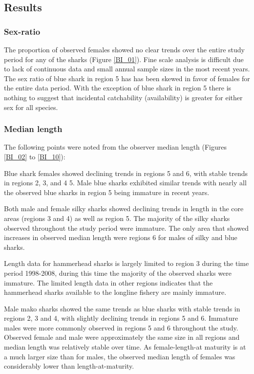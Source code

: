 \documentclass[12pt]{SCreport}
\begin{document}
% 
\subsection{Results}
\subsubsection{Sex-ratio}
    The proportion of observed females showed no clear trends over the entire study period for any of the sharks (Figure \ref{BI_01}).  Fine scale analysis is difficult due to lack of continuous data and small annual sample sizes in the most recent years.   The sex ratio of blue shark in region 5 has has been skewed in favor of females for the entire data period. With the exception of blue shark in region 5 there is nothing to suggest that incidental catchability (availability) is greater for either sex for all species.
    
\subsubsection{Median length}
The following points were noted from the observer median length (Figures \ref{BI_02} to \ref{BI_10}):

Blue shark females showed declining trends in regions 5 and 6, with stable trends in regions 2, 3, and 4 5. Male blue sharks exhibited similar trends with nearly all the observed blue sharks in region 5 being immature in recent years. 

Both male and female silky sharks showed declining trends in length in the core areas (regions 3 and 4) as well as region 5.  The majority of the silky sharks observed throughout the study period were immature. The only area  that showed increases in observed median length were regions 6 for males of silky and blue sharks. 

Length data for hammerhead sharks is largely limited to region 3 during the time period 1998-2008, during this time the majority of the observed sharks were immature. The limited length data in other regions indicates that the hammerhead sharks available to the longline fishery are mainly immature.

Male mako sharks showed the same trends as blue sharks with stable trends in regions 2, 3 and 4, with slightly declining trends in regions 5 and 6. Immature males were more commonly observed in regions 5 and 6 throughout the study.  Observed female and male were approximately the same size in all regions and median length was relatively stable over time.  As female-length-at maturity is at a much larger size than for males, the observed median length of females was considerably lower than length-at-maturity.
\end{document}

